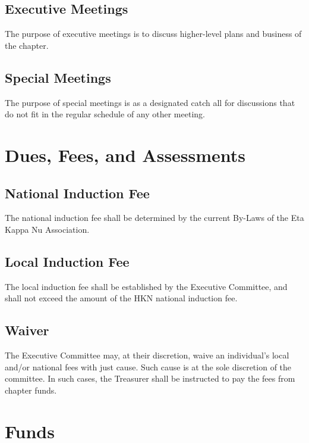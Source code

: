 \documentclass[11pt]{article}
\begin{document}
\subsection{Executive Meetings}
\label{sec:org66c1070}

The purpose of executive meetings is to discuss higher-level plans and business of the chapter.

\subsection{Special Meetings}
\label{sec:org5c39415}

The purpose of special meetings is as a designated catch all for discussions that do not fit in the regular schedule of any other meeting.
\section{Dues, Fees, and Assessments}
\label{sec:orga7dd37e}

\subsection{National Induction Fee}
\label{sec:orgedafecf}

The national induction fee shall be determined by the current By-Laws of the Eta Kappa Nu Association.

\subsection{Local Induction Fee}
\label{sec:orgdb53f65}

The local induction fee shall be established by the Executive Committee, and shall not exceed the amount of the HKN national induction fee.

\subsection{Waiver}
\label{sec:orga2ef889}

The Executive Committee may, at their discretion, waive an individual’s local and/or national fees with just cause.
Such cause is at the sole discretion of the committee. In such cases, the Treasurer shall be instructed to pay the fees from chapter funds.
\section{Funds}
\label{sec:org89c9483}
\end{document}
